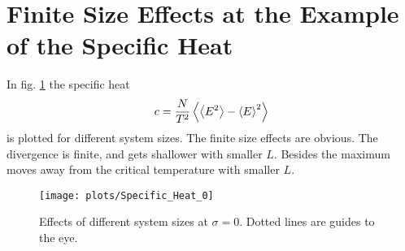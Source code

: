 \section{Finite Size Effects at the Example of the Specific Heat}
\label{appendix:finiteSizeEffects}
    In fig. \ref{fig:smeared_out_appendix} the specific heat
    \begin{equation}
        c = \frac{N}{T^2}\left< \left< E^2 \right> - \left< E \right>^2 \right>
    \end{equation}
    is plotted for different system sizes. The finite size effects are obvious.
    The divergence is finite, and gets shallower with smaller \(L\). Besides
    the maximum moves away from the critical temperature with smaller \(L\).
    \begin{figure}[htbp]
        \centering
        \texttt{[image: plots/Specific\_Heat\_0]}
        \caption[Finite Size Effects by Example of the Specific Heat]
        {
            Effects of different system sizes at \(\sigma = 0\). Dotted lines
            are guides to the eye.
        }
        \label{fig:smeared_out_appendix}
    \end{figure}
